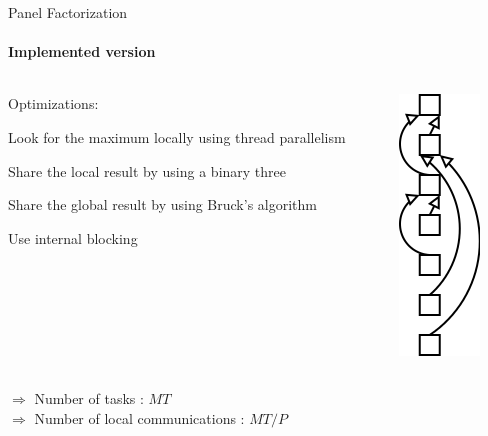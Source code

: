 \begin{frame}{Panel Factorization}
\framesubtitle{Implemented version}
\begin{columns}
\begin{column}{.70\textwidth}
Optimizations:
\begin{itemize}
{
\item Look for the maximum locally using thread parallelism}
\item Share the local result by using a binary three
\item Share the global result by using Bruck's algorithm
\item Use internal blocking
\end{itemize}
\end{column}
\hfill
\begin{column}{.30\textwidth}
\begin{center}
\includegraphics[scale=0.6]{binary_reduction.png}
\end{center}
\end{column}
\end{columns}
\pause
\begin{exampleblock}{}
$\Longrightarrow$ Number of tasks : $MT$\\
$\Longrightarrow$ Number of local communications : $MT/P$
\end{exampleblock}{}
\end{frame}


